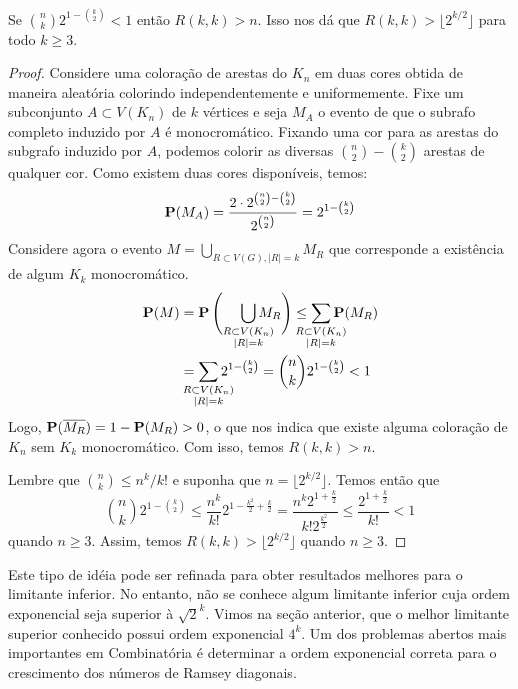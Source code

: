 \begin{theorem}[Erdös, 1947]
Se $\displaystyle \binom{n}{k} 2^{1 - \binom{k}{2}} < 1$ então $R(k,k) > n$. Isso nos dá que $R(k,k) > \lfloor 2^{k/2} \rfloor$ para todo $k \geq 3$.
\end{theorem}
\begin{proof}
Considere uma coloração de arestas do $K_n$ em duas cores obtida de maneira aleatória colorindo independentemente e uniformemente. Fixe um subconjunto $A \subset V(K_n)$ de $k$ vértices e seja $M_A$ o evento de que o subrafo completo induzido por $A$ é monocromático. Fixando uma cor para as arestas do subgrafo induzido por $A$, podemos colorir as diversas $\binom{n}{2} - \binom{k}{2}$ arestas de qualquer cor. Como existem duas cores disponíveis, temos:
\[ \operatorname{\mathbf{P}}(M_A) = \frac{2\cdot 2^{\binom{n}{2} - \binom{k}{2}}}{2^{\binom{n}{2}}}  = 2^{1 - \binom{k}{2}} \]
Considere agora o evento $M = \bigcup_{R \subset V(G), |R|=k}M_R$ que corresponde a existência de algum $K_k$ monocromático.
\begin{align*}
\prob(M) &= \prob\Bigg( \;\;\;\;\bigcup_{\mathclap{\substack{R \subset V(K_n)\\ |R| = k}}}M_R \Bigg) \leq \sum_{\mathclap{\substack{R \subset V(K_n)\\ |R| = k}}}\prob(M_R) \\
&= \sum_{\mathclap{\substack{R \subset V(K_n)\\ |R| = k}}} 2^{1 - \binom{k}{2}} = \binom{n}{k} 2^{1 - \binom{k}{2}} < 1
\end{align*}
Logo, $\operatorname{\mathbf{P}}(\overline{M_R}) = 1 - \operatorname{\mathbf{P}}(M_R) > 0$, o que nos indica que existe alguma coloração de $K_n$ sem $K_k$ monocromático. Com isso, temos $R(k,k) > n$.

Lembre que $\binom{n}{k} \leq n^k /k!$ e suponha que $n = \lfloor 2^{k/2} \rfloor$. Temos então que
\[ \binom{n}{k}2^{1 - \binom{k}{2}} \leq \frac{n^k}{k!}2^{1 - \frac{k^2}{2} + \frac{k}{2}} = \frac{n^k 2^{1 + \frac{k}{2}}}{k!2^{\frac{k^2}{2}}} \leq \frac{2^{1 + \frac{k}{2}}}{k!} < 1 \]
quando $n \geq 3$. Assim, temos $R(k,k) > \lfloor 2^{k/2} \rfloor$ quando $n \geq 3$.
\end{proof}

Este tipo de idéia pode ser refinada para obter resultados melhores para o limitante inferior. No entanto, não se conhece algum limitante inferior cuja ordem exponencial seja superior à $\sqrt{2}^k$. Vimos na seção anterior, que o melhor limitante superior conhecido possui ordem exponencial $4^k$. Um dos problemas abertos mais importantes em Combinatória é determinar a ordem exponencial correta para o crescimento dos números de Ramsey diagonais.

